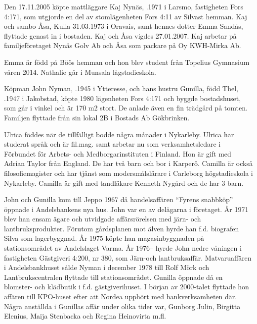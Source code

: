 Den 17.11.2005 köpte mattläggare Kaj Nynäs, .1971 i Larsmo, fastigheten Fors 4:171, som utgjorde en del av stomlägenheten Fors 4:11 av Silvast hemman.  Kaj och sambo Åsa, \textborn Kulla 31.03.1973 i Oravais, samt hennes dotter Emma Sandås, flyttade genast in i bostaden. Kaj och Åsa vigdes 27.01.2007. Kaj arbetar på familjeföretaget Nynäs Golv Ab och Åsa som packare på Oy KWH-Mirka Ab.
\begin{jhchildren}
  \item {}
  \item {}
  \item {}
\end{jhchildren}

Emma är född på Böös hemman och hon blev student från Topelius Gymnasium våren 2014. Nathalie går i Munsala lågstadieskola.


Köpman John Nyman, .1945 i Ytteresse, och hans hustru Gunilla, född Thel, .1947 i Jakobstad, köpte 1980 lägenheten Fors 4:171 och byggde bostadshuset, som går i vinkel och är 170 m2 stort. De anlade även en fin trädgård på tomten. Familjen flyttade från sin lokal 2B i Bostads Ab Gökbrinken.
\begin{jhchildren}
  \item {}
  \item {}
\end{jhchildren}
Ulrica föddes när de tillfälligt bodde några månader i Nykarleby. Ulrica har studerat språk och är fil.mag. samt arbetar nu som verksamhetsledare i Förbundet för Arbets- och Medborgarinstituten i Finland. Hon är gift med Adrian Taylor från England. De har två barn och bor i Karperö. Camilla är också filosofiemagister och har tjänst som modersmålslärare i Carleborg högstadieskola i Nykarleby. Camilla är gift med tandläkare Kenneth Nygård och de har 3 barn.

John och Gunilla kom till Jeppo 1967 då handelsaffären ``Fyrens snabbköp'' öppnade i Andelsbankens nya hus. John var en av delägarna i företaget. År 1971 blev han ensam ägare och utvidgade affärsrörelsen med järn- och lantbruksprodukter. Förutom gårdsplanen mot älven hyrde han f.d. biografen Silva som lagerbyggnad. År 1975 köpte han magasinbyggnaden på stationsområdet av Andelslaget Varma. År 1976-- hyrde John nedre våningen i fastigheten Gästgiveri 4:200, nr 380, som Järn-och lantbruksaffär. Matvaruaffären i Andelsbankhuset sålde Nyman i december 1978 till Rolf Mörk och Lantbrukscentralen flyttade till stationsområdet. Gunilla öppnade då en blomster- och klädbutik i f.d. gästgiverihuset. I början av 2000-talet flyttade hon affären till KPO-huset efter att Nordea upphört med bankverksamheten där. Några anställda i Gunillas affär under olika tider var, Gunborg Julin, Birgitta Elenius, Maija Stenbacka och Regina Heinovirta m.fl.

